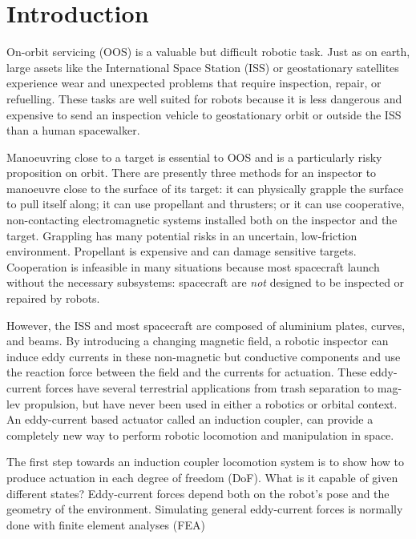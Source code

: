 \documentclass[letterpaper, 10 pt, conference]{ieeeconf}  %
\begin{document}
\section{Introduction}
On-orbit servicing (OOS)\label{def:OOS} is a valuable but difficult robotic task. \cite{Coleshill2009}\cite{Ellery2004}\cite{Ellery2008}  
Just as on earth, large assets like the International Space Station (ISS) \label{def:ISS} or geostationary satellites experience wear and unexpected problems that require inspection, repair, or refuelling.\cite{Moosavian2007} \cite{Saleh2002}  These tasks are well suited for robots because it is less dangerous and expensive to send an inspection vehicle to geostationary orbit or outside the ISS than a human spacewalker.  
%
\par Manoeuvring close to a target is essential to OOS and is a particularly risky proposition on orbit. There are presently three methods for an inspector to manoeuvre close to the surface of its target: it can physically grapple the surface to pull itself along; it can use propellant and thrusters; or it can use cooperative, non-contacting electromagnetic systems installed both on the inspector and the target. Grappling has many potential risks in an uncertain, low-friction environment. Propellant is expensive and can damage sensitive targets. Cooperation is infeasible in many situations because most spacecraft launch without the necessary subsystems: spacecraft are \textit{not} designed to be inspected or repaired by robots.
%
\par However, the ISS and most spacecraft are composed of aluminium plates, curves, and beams. By introducing a changing magnetic field, a robotic inspector can induce eddy currents in these non-magnetic but conductive components and use the reaction force between the field and the currents for actuation.\cite{Smyth1989} These eddy-current forces have several terrestrial applications from trash separation \cite{Rem1997} to mag-lev propulsion,\cite{Paudel2012a}\cite{Ohji2007} but have never been used in either a robotics or orbital context. An eddy-current based actuator called an induction coupler, can provide a completely new way to perform robotic locomotion and manipulation in space. 
%
\par The first step towards an induction coupler locomotion system is to show how to produce actuation in each degree of freedom (DoF)\label{def:dof}. What is it capable of given different states? Eddy-current forces depend both on the robot's pose and the geometry of the environment. Simulating general eddy-current forces is normally done with finite element analyses (FEA)\label{def:fea} 
\end{document}
